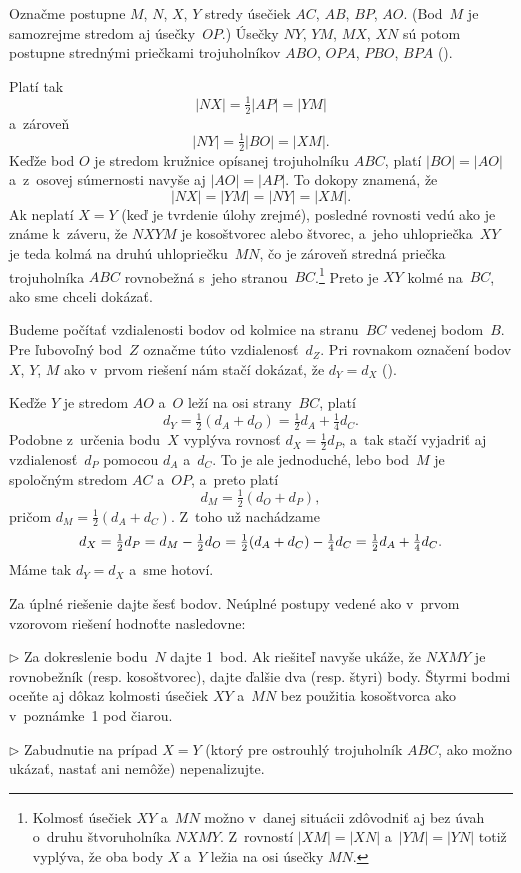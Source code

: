 {%
Označme postupne $M$, $N$, $X$, $Y$ stredy úsečiek $AC$, $AB$, $BP$,
$AO$. (Bod~$M$ je samozrejme stredom aj úsečky~$OP$.)
Úsečky $NY$, $YM$, $MX$, $XN$ sú potom postupne strednými
priečkami trojuholníkov $ABO$, $OPA$, $PBO$, $BPA$ (\obr).
%

Platí tak
$$
|NX| = \tfrac12 |AP| = |YM|
$$
a~zároveň
$$
|NY| = \tfrac12 |BO| = |XM|.
$$
Keďže bod $O$ je stredom kružnice opísanej trojuholníku $ABC$, platí
$|BO| = |AO|$ a~z~osovej súmernosti navyše aj $|AO|=|AP|$. To dokopy
znamená, že
$$
|NX| = |YM| = |NY| = |XM|.
$$
Ak neplatí $X=Y$ (keď je tvrdenie úlohy zrejmé), posledné rovnosti vedú
ako je známe k~záveru, že $NXYM$ je kosoštvorec alebo štvorec,
a~jeho uhlopriečka~$XY$ je teda kolmá na
druhú uhlopriečku~$MN$, čo je zároveň stredná priečka trojuholníka $ABC$
rovnobežná s~jeho stranou~$BC$.\footnote{Kolmosť úsečiek $XY$ a~$MN$
možno v~danej situácii zdôvodniť aj bez úvah
o~druhu štvoruholníka $NXMY$. Z~rovností $|XM|=|XN|$ a~$|YM|=|YN|$ totiž
vyplýva, že oba body $X$ a~$Y$ ležia na osi úsečky $MN$.}
Preto je $XY$ kolmé na~$BC$, ako sme chceli dokázať.

\ineres
Budeme počítať vzdialenosti bodov od kolmice na stranu~$BC$ vedenej
bodom~$B$. Pre ľubovoľný bod~$Z$ označme túto vzdialenosť~$d_Z$.
Pri rovnakom označení bodov $X$, $Y$, $M$ ako v~prvom riešení
nám stačí dokázať, že $d_Y = d_X$ (\obr).


Keďže $Y$ je stredom $AO$ a~$O$ leží na osi strany~$BC$, platí
$$
d_Y = \tfrac12(d_A + d_O) = \tfrac12 d_A + \tfrac14 d_C.
$$
Podobne z~určenia bodu~$X$ vyplýva rovnosť $d_X = \frac12 d_P$, a~tak stačí vyjadriť
aj vzdialenosť~$d_P$ pomocou $d_A$ a~$d_C$. To je ale jednoduché, lebo bod~$M$ je
spoločným stredom $AC$ a~$OP$, a~preto platí
$$
d_M = \tfrac12 (d_O + d_P),
$$
pričom $d_M = \frac12 (d_A+d_C)$. Z~toho už nachádzame
$$
\let\frac\tfrac
d_X = \frac12 d_P = d_M - \frac12 d_O = \frac12(d_A+d_C) - \frac14
d_C =\frac12 d_A + \frac14 d_C.
$$
Máme tak $d_Y = d_X$ a~sme hotoví.



\nobreak\medskip\petit\noindent
Za úplné riešenie dajte šesť bodov.
Neúplné postupy vedené ako v~prvom vzorovom riešení hodnoťte
nasledovne:
\item{$\triangleright$} Za dokreslenie bodu~$N$ dajte 1~bod. Ak riešiteľ navyše ukáže,
že $NXMY$ je rovnobežník (resp. kosoštvorec), dajte ďalšie dva
(resp. štyri) body. Štyrmi bodmi oceňte aj dôkaz kolmosti úsečiek $XY$
a~$MN$ bez použitia kosoštvorca ako v~poznámke~1 pod čiarou.
\item{$\triangleright$} Zabudnutie na prípad $X=Y$ (ktorý pre ostrouhlý trojuholník $ABC$, ako možno
ukázať, nastať ani nemôže) nepenalizujte.

}
